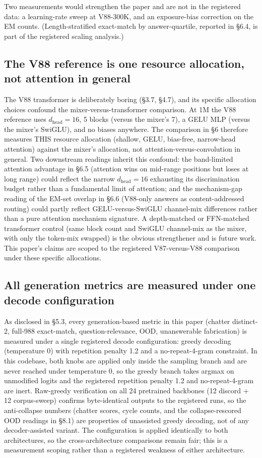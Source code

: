 \documentclass[11pt]{article}
\begin{document}
Two measurements would strengthen the paper and are not in the registered data: a learning-rate sweep at V88-300K, and an exposure-bias correction on the EM counts. (Length-stratified exact-match by answer-quartile, reported in \S6.4, is part of the registered scaling analysis.)

\subsection{The V88 reference is one resource allocation, not attention in general}

The V88 transformer is deliberately boring (\S3.7, \S4.7), and its specific allocation choices confound the mixer-versus-transformer comparison. At 1M the V88 reference uses $d_{\text{head}} = 16$, 5 blocks (versus the mixer's 7), a GELU MLP (versus the mixer's SwiGLU), and no biases anywhere. The comparison in \S6 therefore measures THIS resource allocation (shallow, GELU, bias-free, narrow-head attention) against the mixer's allocation, not attention-versus-convolution in general. Two downstream readings inherit this confound: the band-limited attention advantage in \S6.5 (attention wins on mid-range positions but loses at long range) could reflect the narrow $d_{\text{head}} = 16$ exhausting its discrimination budget rather than a fundamental limit of attention; and the mechanism-gap reading of the EM-set overlap in \S6.6 (V88-only answers as content-addressed routing) could partly reflect GELU-versus-SwiGLU channel-mix differences rather than a pure attention mechanism signature. A depth-matched or FFN-matched transformer control (same block count and SwiGLU channel-mix as the mixer, with only the token-mix swapped) is the obvious strengthener and is future work. This paper's claims are scoped to the registered V87-versus-V88 comparison under these specific allocations.

\subsection{All generation metrics are measured under one decode configuration}

As disclosed in \S5.3, every generation-based metric in this paper (chatter distinct-2, full-988 exact-match, question-relevance, OOD, unanswerable fabrication) is measured under a single registered decode configuration: greedy decoding (temperature 0) with repetition penalty 1.2 and a no-repeat-4-gram constraint. In this codebase, both knobs are applied only inside the sampling branch and are never reached under temperature 0, so the greedy branch takes argmax on unmodified logits and the registered repetition penalty 1.2 and no-repeat-4-gram are inert. Raw-greedy verification on all 24 pretrained backbones (12 discord + 12 corpus-sweep) confirms byte-identical outputs to the registered runs, so the anti-collapse numbers (chatter scores, cycle counts, and the collapse-rescored OOD readings in \S8.1) are properties of unassisted greedy decoding, not of any decoder-assisted variant. The configuration is applied identically to both architectures, so the cross-architecture comparisons remain fair; this is a measurement scoping rather than a registered weakness of either architecture.
\end{document}

